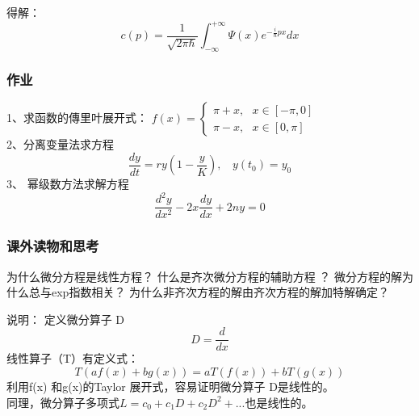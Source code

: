 \begin{frame}
	得解：
	\begin{equation*}
		c(p) = \frac{1}{\sqrt{2\pi \hbar }} \int_{-\infty}^{+\infty} \Psi(x) e^{-\frac{i}{\hbar} px} dx
	\end{equation*}   
\end{frame}


\begin{frame}
\frametitle{作业 }
	1、求函数的傳里叶展开式：
	$\displaystyle f(x)=\begin{cases}
		\pi +x , ~~~ x \in [-\pi, 0] \\
		\pi -x ,~~~ x \in   [0, \pi] 
	\end{cases}$ \\
	2、分离变量法求方程\\
	\begin{equation*}
		\frac{dy}{dt}	=  r y (1-\frac{y}{K}), ~~~~ y(t_0) = y_0
	\end{equation*}
	3、	幂级数方法求解方程\\
	\begin{equation*}
		\frac{d^2 y}{d x^2} -2x \frac{d y}{d x} +2n y =0 
	\end{equation*}     
\end{frame}

\begin{frame}
	\frametitle{课外读物和思考}
	\begin{itemize}
		\IItem 为什么微分方程是线性方程？
		\IItem 什么是齐次微分方程的辅助方程 ？
		\IItem 微分方程的解为什么总与exp指数相关？ 
		\IItem 为什么非齐次方程的解由齐次方程的解加特解确定？
	\end{itemize}	
\end{frame}

\begin{frame}
	\alert{说明：} 	定义微分算子 D
	\begin{equation*}
		D= \dfrac{d}{dx}
	\end{equation*}	
	线性算子（T）有定义式：
	\begin{equation*}
		T(a f(x) +b g(x) )  =a T(f(x)) +b T(g(x)) 
   \end{equation*}	
 	利用f(x) 和g(x)的Taylor 展开式，容易证明微分算子 D是线性的。\\ \vspace{0.3em}
	同理，微分算子多项式$	L= c_0 + c_1D +c_2D^2 +...  $也是线性的。\\
\end{frame}

